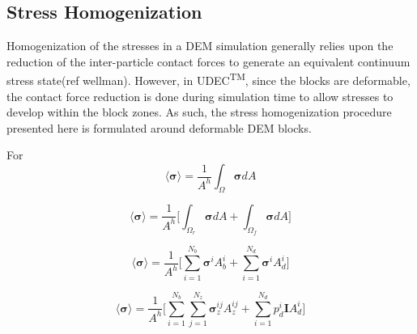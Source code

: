 \subsection{Stress Homogenization}
Homogenization of the stresses in a DEM simulation generally relies upon the reduction of the inter-particle contact forces to generate an equivalent continuum stress state(ref wellman). However, in UDEC\textsuperscript{TM}, since the blocks are deformable, the contact force reduction is done during simulation time to allow stresses to develop within the block zones. As such, the stress homogenization procedure presented here is formulated around deformable DEM blocks.  

For 
\begin{equation}
\label{eqn:stress1}
\langle \boldsymbol{\sigma} \rangle = 
\frac{1}{A^h} \int_\Omega \boldsymbol{\sigma} { dA}
\end{equation}

\begin{equation}
\label{eqn:stress2}
\langle \boldsymbol{\sigma} \rangle = 
\frac{1}{A^h} \bigg \lbrack {\int_{\Omega_{r}} \boldsymbol{\sigma} { dA} + 
\int_{\Omega_{f}} \boldsymbol{\sigma} { dA}} \bigg \rbrack
\end{equation}

\begin{equation}
\label{eqn:stress3}
\langle \boldsymbol{\sigma} \rangle = 
\frac{1}{A^h} \bigg \lbrack \sum_{i=1}^{N_{b}} \boldsymbol{\sigma}^{i} A_{b}^{i} + 
\sum_{i=1}^{N_{d}} \boldsymbol{\sigma}^{i} A_{d}^{i} \bigg \rbrack
\end{equation}

\begin{equation}
\label{eqn:stress4}
\langle \boldsymbol{\sigma} \rangle = 
\frac{1}{A^h} \bigg \lbrack \sum_{i=1}^{N_{b}} \sum_{j=1}^{N_{z}} \boldsymbol{\sigma}_z^{ij} A_{z}^{ij} + 
\sum_{i=1}^{N_{d}} p_d^{i} \textbf{I} A_{d}^{i} \bigg \rbrack
\end{equation}
